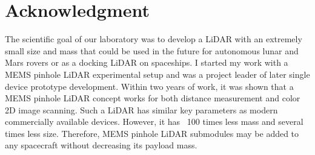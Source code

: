 \chapter*{Acknowledgment}
The scientific goal of our laboratory was to develop a LiDAR with an extremely small size and mass
that could be used in the future for autonomous lunar and Mars rovers or as a docking LiDAR on
spaceships. I started my work with a MEMS pinhole LiDAR experimental setup and was a project
leader of later single device prototype development.
Within two years of work, it was shown that a MEMS pinhole LiDAR concept works for both distance
measurement and color 2D image scanning. Such a LiDAR has similar key parameters as modern
commercially available devices. However, it has ~100 times less mass and several times less size.
Therefore, MEMS pinhole LiDAR submodules may be added to any spacecraft without decreasing its
payload mass.

